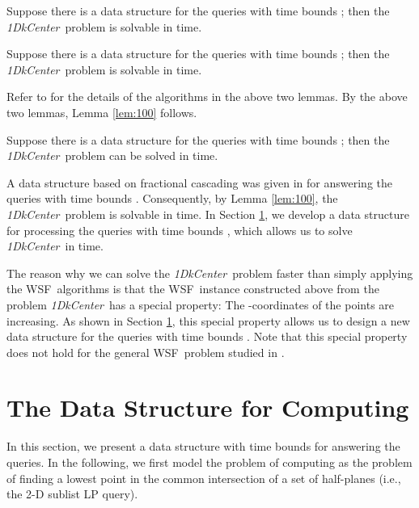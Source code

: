 \documentclass{llncs}
\def\wsf{WSF}
\def\problem{{\it 1DkCenter}}
\begin{document}
\begin{lemma}\label{lem:10}{\em \cite{ref:ChenAp091}} Suppose
there is a data structure for the queries  with time
bounds ; then the \problem\ problem is solvable
in  time.
\end{lemma}

\begin{lemma}\label{lem:20}{\em \cite{ref:ChenAp091}} Suppose
there is a data structure for the queries  with time
bounds ; then the \problem\ problem is solvable
in  time.
\end{lemma}

Refer to \cite{ref:ChenAp091} for the details of the algorithms in the
above two lemmas.
By the above two lemmas, Lemma \ref{lem:100} follows.

\begin{lemma}\label{lem:100} Suppose
there is a data structure for the queries  with time
bounds ; then the \problem\ problem can be solved
in  time.
\end{lemma}





A data structure based on fractional cascading \cite{ref:ChazelleFr86} was given in
\cite{ref:ChenAp091} for answering the
queries  with time bounds . Consequently, by
Lemma \ref{lem:100}, the \problem\ problem is
solvable in  time. In Section \ref{sec:chreduction}, we develop a data
structure for processing the queries  with time bounds
, which allows us to solve \problem\
in  time.

The reason why we can solve the \problem\ problem faster than simply applying
the \wsf\ algorithms \cite{ref:ChenAp091} is that the
\wsf\ instance constructed above from the problem \problem\ has a special property: The
-coordinates of the points  are increasing.
As shown in Section \ref{sec:chreduction}, this
special property allows us to design a new data structure for the 
queries with time bounds .
Note that this special property does not hold for the general \wsf\
problem studied in \cite{ref:ChenAp091}.








\section{The Data Structure for Computing }
\label{sec:chreduction}


In this section, we present a data structure with time bounds
 for answering the  queries.
In the following, we first model the problem of computing 
as the problem of finding a lowest point in the common
intersection of a set of half-planes (i.e., the 2-D sublist LP query).
\end{document}
